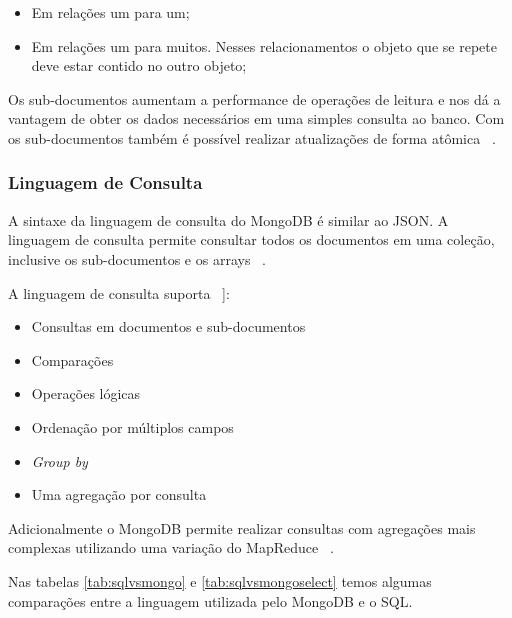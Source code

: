 \begin{itemize}
	\item Em relações um para um;
	\item Em relações um para muitos. Nesses relacionamentos o objeto que se repete deve estar contido no outro objeto;
\end{itemize}

Os sub-documentos aumentam a performance de operações de leitura e nos dá a vantagem de obter os dados necessários em uma simples consulta ao banco. Com os sub-documentos também é possível realizar atualizações de forma atômica ~\cite{Orendanalysisand}.

\subsubsection{Linguagem de Consulta}

A sintaxe da linguagem de consulta do MongoDB é similar ao JSON. A linguagem de consulta permite consultar todos os documentos em uma coleção, inclusive os sub-documentos e os arrays ~\cite{Orendanalysisand}.

A linguagem de consulta suporta ~\cite{Orendanalysisand}]:
\begin{itemize}
	\item Consultas em documentos e sub-documentos
	\item Comparações
	\item Operações lógicas
	\item Ordenação por múltiplos campos
	\item \textit{Group by}
	\item Uma agregação por consulta
\end{itemize}

Adicionalmente o MongoDB permite realizar consultas com agregações mais complexas utilizando uma variação do MapReduce ~\cite{Orendanalysisand}.

Nas tabelas \ref{tab:sqlvsmongo} e  \ref{tab:sqlvsmongoselect} temos algumas comparações entre a linguagem utilizada pelo MongoDB e o SQL.

